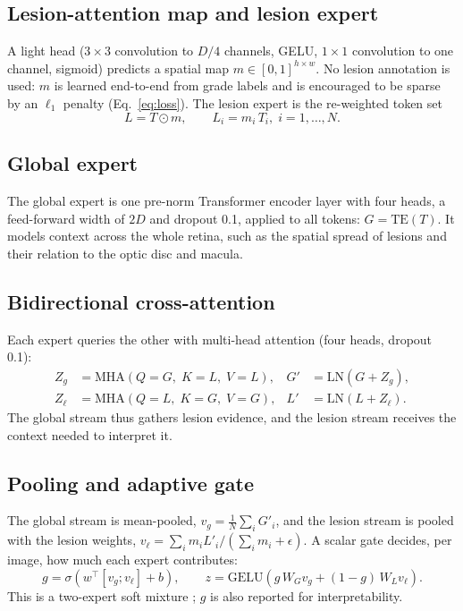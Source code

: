 \subsection{Lesion-attention map and lesion expert}
A light head ($3\times3$ convolution to $D/4$ channels, GELU, $1\times1$ convolution to one channel, sigmoid)
predicts a spatial map $m\in[0,1]^{h\times w}$. No lesion annotation is used: $m$ is learned end-to-end from grade
labels and is encouraged to be sparse by an $\ell_1$ penalty (Eq.~\ref{eq:loss}). The lesion expert is the
re-weighted token set
\begin{equation}
L = T\odot m, \qquad L_i = m_i\,T_i,\; i=1,\dots,N.
\end{equation}

\subsection{Global expert}
The global expert is one pre-norm Transformer encoder layer \citep{vaswani2017attention} with four heads, a
feed-forward width of $2D$ and dropout 0.1, applied to all tokens: $G = \mathrm{TE}(T)$. It models context across
the whole retina, such as the spatial spread of lesions and their relation to the optic disc and macula.

\subsection{Bidirectional cross-attention}
Each expert queries the other with multi-head attention (four heads, dropout 0.1):
\begin{align}
Z_g &= \mathrm{MHA}(Q{=}G,\;K{=}L,\;V{=}L), & G' &= \mathrm{LN}(G + Z_g),\\
Z_\ell &= \mathrm{MHA}(Q{=}L,\;K{=}G,\;V{=}G), & L' &= \mathrm{LN}(L + Z_\ell).
\end{align}
The global stream thus gathers lesion evidence, and the lesion stream receives the context needed to interpret it.

\subsection{Pooling and adaptive gate}
The global stream is mean-pooled, $v_g = \frac1N\sum_i G'_i$, and the lesion stream is pooled with the lesion
weights, $v_\ell = \sum_i m_i L'_i \big/ (\sum_i m_i + \epsilon)$. A scalar gate decides, per image, how much each
expert contributes:
\begin{equation}
g = \sigma\!\left(w^\top[v_g; v_\ell] + b\right),\qquad
z = \mathrm{GELU}\!\left(g\,W_G v_g + (1-g)\,W_L v_\ell\right).
\label{eq:gate}
\end{equation}
This is a two-expert soft mixture \citep{jacobs1991adaptive}; $g$ is also reported for interpretability.

